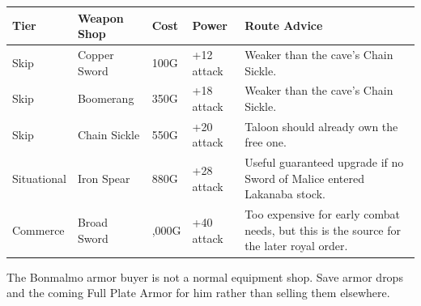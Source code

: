 \documentclass[
  american,
  10pt,
  letterpaper,
  oneside,
  open=any]{scrreprt}
\newcounter{none} %
\newenvironment{guidetable}{%
  \small\setstretch{1.0}%
  \setlength{\tabcolsep}{4pt}%
  \setlength{\LTpre}{8pt}\setlength{\LTpost}{10pt}%
  \renewcommand{\arraystretch}{1.16}%
}{ }
\begin{document}
\begin{guidetable}

{\def\LTcaptype{none} %
\begin{longtable}[]{@{}
  >{\raggedright\arraybackslash}p{}
  >{\raggedright\arraybackslash}p{}
  >{\raggedleft\arraybackslash}p{}
  >{\raggedleft\arraybackslash}p{}
  >{\raggedright\arraybackslash}p{}@{}}
\toprule\noalign{}
\begin{minipage}[b]{\linewidth}\raggedright
\color{GuideGreen}\bfseries Tier
\end{minipage} & \begin{minipage}[b]{\linewidth}\raggedright
\color{GuideGreen}\bfseries Weapon Shop
\end{minipage} & \begin{minipage}[b]{\linewidth}\raggedleft
\color{GuideGreen}\bfseries Cost
\end{minipage} & \begin{minipage}[b]{\linewidth}\raggedleft
\color{GuideGreen}\bfseries Power
\end{minipage} & \begin{minipage}[b]{\linewidth}\raggedright
\color{GuideGreen}\bfseries Route Advice
\end{minipage} \\
\midrule\noalign{}
\endhead
\bottomrule\noalign{}
\endlastfoot
Skip & Copper Sword & 100G & +12 attack & Weaker than the cave's Chain
Sickle. \\
Skip & Boomerang & 350G & +18 attack & Weaker than the cave's Chain
Sickle. \\
Skip & Chain Sickle & 550G & +20 attack & Taloon should already own the
free one. \\
Situational & Iron Spear & 880G & +28 attack & Useful guaranteed upgrade
if no Sword of Malice entered Lakanaba stock. \\
Commerce & Broad Sword & 2,000G & +40 attack & Too expensive for early
combat needs, but this is the source for the later royal order. \\
\end{longtable}
}

\end{guidetable}

The Bonmalmo armor buyer is not a normal equipment shop. Save armor
drops and the coming Full Plate Armor for him rather than selling them
elsewhere.
\end{document}
